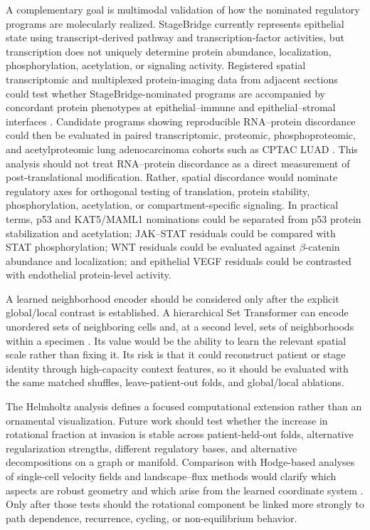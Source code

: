 A complementary goal is multimodal validation of how the nominated regulatory programs are molecularly realized. StageBridge currently represents epithelial state using transcript-derived pathway and transcription-factor activities, but transcription does not uniquely determine protein abundance, localization, phosphorylation, acetylation, or signaling activity. Registered spatial transcriptomic and multiplexed protein-imaging data from adjacent sections could test whether StageBridge-nominated programs are accompanied by concordant protein phenotypes at epithelial--immune and epithelial--stromal interfaces \autocite{Takano2024-ys}. Candidate programs showing reproducible RNA--protein discordance could then be evaluated in paired transcriptomic, proteomic, phosphoproteomic, and acetylproteomic lung adenocarcinoma cohorts such as CPTAC LUAD \autocite{Gillette2020-pg}. This analysis should not treat RNA--protein discordance as a direct measurement of post-translational modification. Rather, spatial discordance would nominate regulatory axes for orthogonal testing of translation, protein stability, phosphorylation, acetylation, or compartment-specific signaling. In practical terms, p53 and KAT5/MAML1 nominations could be separated from p53 protein stabilization and acetylation; JAK--STAT residuals could be compared with STAT phosphorylation; WNT residuals could be evaluated against $\beta$-catenin abundance and localization; and epithelial VEGF residuals could be contrasted with endothelial protein-level activity.

A learned neighborhood encoder should be considered only after the explicit global/local contrast is established. A hierarchical Set Transformer can encode unordered sets of neighboring cells and, at a second level, sets of neighborhoods within a specimen \autocite{Lee2019-st}. Its value would be the ability to learn the relevant spatial scale rather than fixing it. Its risk is that it could reconstruct patient or stage identity through high-capacity context features, so it should be evaluated with the same matched shuffles, leave-patient-out folds, and global/local ablations.

The Helmholtz analysis defines a focused computational extension rather than an ornamental visualization. Future work should test whether the increase in rotational fraction at invasion is stable across patient-held-out folds, alternative regularization strengths, different regulatory bases, and alternative decompositions on a graph or manifold. Comparison with Hodge-based analyses of single-cell velocity fields and landscape--flux methods would clarify which aspects are robust geometry and which arise from the learned coordinate system \autocite{Su2024-hd,Zhu2024-lf}. Only after those tests should the rotational component be linked more strongly to path dependence, recurrence, cycling, or non-equilibrium behavior.

